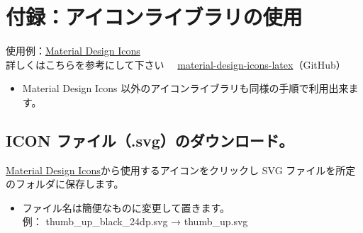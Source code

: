 \documentclass[10pt]{ltjarticle}
\begin{document}
\newpage

\section{付録：アイコンライブラリの使用}
使用例：\href{https://fonts.google.com/icons}{Material Design Icons}\\
\hspace{4mm}詳しくはこちらを参考にして下さい \glRightarrow　\href{https://github.com/ru-museum/material-design-icons-latex}{material-design-icons-latex}（GitHub）

\begin{itemize}
  \item Material Design Icons 以外のアイコンライブラリも同様の手順で利用出来ます。
\end{itemize}

\subsection{ICON ファイル（.svg）のダウンロード。}
\href{https://fonts.google.com/icons}{Material Design Icons}から使用するアイコンをクリックし SVG ファイルを所定のフォルダに保存します。

\begin{itemize}
  \item ファイル名は簡便なものに変更して置きます。\\
\hspace{4mm}例： thumb\_up\_black\_24dp.svg → thumb\_up.svg　
\end{itemize}
\end{document}
